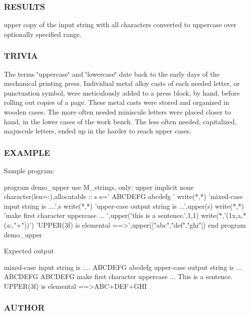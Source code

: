 \subsubsection*{R\+E\+S\+U\+L\+TS}

upper copy of the input string with all characters converted to uppercase over optionally specified range.

\subsubsection*{T\+R\+I\+V\+IA}

The terms \char`\"{}uppercase\char`\"{} and \char`\"{}lowercase\char`\"{} date back to the early days of the mechanical printing press. Individual metal alloy casts of each needed letter, or punctuation symbol, were meticulously added to a press block, by hand, before rolling out copies of a page. These metal casts were stored and organized in wooden cases. The more often needed miniscule letters were placed closer to hand, in the lower cases of the work bench. The less often needed, capitalized, majuscule letters, ended up in the harder to reach upper cases.

\subsubsection*{E\+X\+A\+M\+P\+LE}

Sample program\+: \begin{DoxyVerb}program demo_upper
use M_strings, only: upper
implicit none
character(len=:),allocatable  :: s
   s=' ABCDEFG abcdefg '
   write(*,*) 'mixed-case input string is ....',s
   write(*,*) 'upper-case output string is ...',upper(s)
   write(*,*) 'make first character uppercase  ... ',upper('this is a sentence.',1,1)
   write(*,'(1x,a,*(a:,"+"))') 'UPPER(3f) is elemental ==>',upper(["abc","def","ghi"])
end program demo_upper
\end{DoxyVerb}


Expected output \begin{DoxyVerb}mixed-case input string is .... ABCDEFG abcdefg
upper-case output string is ... ABCDEFG ABCDEFG
make first character uppercase  ... This is a sentence.
UPPER(3f) is elemental ==>ABC+DEF+GHI
\end{DoxyVerb}
 \subsubsection*{A\+U\+T\+H\+OR}

